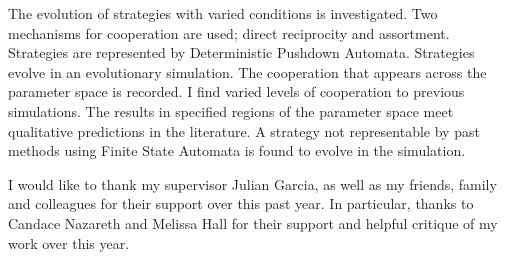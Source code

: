 \documentclass[a4paper,11pt,bcshonoursthesis,singlespace,oneside,thesisdraft,pdflatex]{cssethesis}
\begin{document}
\frontmatter					%

\thesistitlepage				%
\thesiscopyrightpage			%
\tableofcontents				%
\listoftables					%
\listoffigures					%

\begin{thesisabstract}			%
The evolution of strategies with varied conditions is investigated. 
Two mechanisms for cooperation are used; direct reciprocity and assortment. 
Strategies are represented by Deterministic Pushdown Automata. 
Strategies evolve in an evolutionary simulation. 
The cooperation that appears across the parameter space is recorded. 
I find varied levels of cooperation to previous simulations. 
The results in specified regions of the parameter space meet qualitative predictions in the literature.
A strategy not representable by past methods using Finite State Automata is found to evolve in the simulation. 
\end{thesisabstract}                 

\thesisdeclarationpage			%

\begin{thesisacknowledgments}	%
I would like to thank my supervisor Julian Garcia, as well as my friends, family and colleagues for their support over this past year. In particular, thanks to Candace Nazareth and Melissa Hall for their support and helpful critique of my work over this year.
\end{thesisacknowledgments}   

\mainmatter						%
\end{document}
